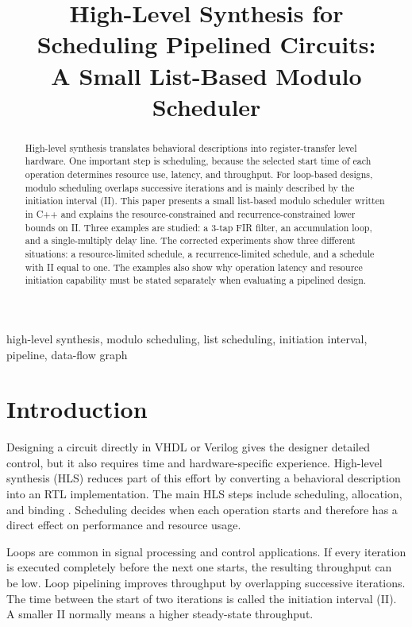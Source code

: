 \documentclass[conference]{IEEEtran}
\title{High-Level Synthesis for Scheduling Pipelined Circuits:\\
A Small List-Based Modulo Scheduler}
\author{
\IEEEauthorblockN{Md Ratul Ahmed Alvi}
\IEEEauthorblockA{
Department of Electrical Engineering\\
Hochschule Hamm-Lippstadt (HSHL)\\
Lippstadt, Germany\\
md-ratul-ahmed.alvi@stud.hshl.de}
}
\begin{document}
\maketitle

\begin{abstract}
High-level synthesis translates behavioral descriptions into register-transfer
level hardware. One important step is scheduling, because the selected start time
of each operation determines resource use, latency, and throughput. For loop-based
designs, modulo scheduling overlaps successive iterations and is mainly described
by the initiation interval (II). This paper presents a small list-based modulo
scheduler written in C++ and explains the resource-constrained and
recurrence-constrained lower bounds on II. Three examples are studied: a 3-tap FIR
filter, an accumulation loop, and a single-multiply delay line. The corrected
experiments show three different situations: a resource-limited schedule, a
recurrence-limited schedule, and a schedule with II equal to one. The examples also
show why operation latency and resource initiation capability must be stated
separately when evaluating a pipelined design.
\end{abstract}

\begin{IEEEkeywords}
high-level synthesis, modulo scheduling, list scheduling, initiation interval,
pipeline, data-flow graph
\end{IEEEkeywords}

\section{Introduction}

Designing a circuit directly in VHDL or Verilog gives the designer detailed
control, but it also requires time and hardware-specific experience. High-level
synthesis (HLS) reduces part of this effort by converting a behavioral description
into an RTL implementation. The main HLS steps include scheduling, allocation, and
binding \cite{demicheli1994}. Scheduling decides when each operation starts and
therefore has a direct effect on performance and resource usage.

Loops are common in signal processing and control applications. If every
iteration is executed completely before the next one starts, the resulting
throughput can be low. Loop pipelining improves throughput by overlapping
successive iterations. The time between the start of two iterations is called the
initiation interval (II). A smaller II normally means a higher steady-state
throughput.
\end{document}
